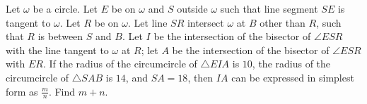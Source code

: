 Let $\omega$ be a circle. Let $E$ be on $\omega$ and $S$ outside $\omega$ such that line segment $SE$ is tangent to $\omega$. Let $R$ be on $\omega$. Let line $SR$ intersect $\omega$ at $B$ other than $R$,  such that $R$ is between $S$ and $B$. Let $I$ be the intersection of the bisector of $\angle ESR$ with the line tangent to $\omega$ at $R$; let $A$ be the intersection of the bisector of $\angle ESR$ with $ER$. If the radius of the circumcircle of $\triangle EIA$ is $10$,  the radius of the circumcircle of $\triangle SAB$ is $14$,  and $SA = 18$,  then $IA$ can be expressed in simplest form as $\frac{m}{n}$. Find $m + n$.